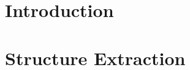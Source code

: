 \documentclass{report}
\begin{document}
\section{Introduction}


\section{Structure Extraction}

\end{document}
